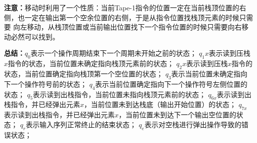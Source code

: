 \begin{solution}
    \textbf{注意：}移动时利用了一个性质：当前Tape-1指令的位置一定在当前栈顶位置的右侧，也一定在输出第一个空余位置的右侧，于是从指令位置找栈顶元素的时候只需要
    向左移动，从栈顶位置或当前输出位置找下一个指令位置的时候只需要向右移动必然可以找到。

    \textbf{总结：}$q_0$表示一个操作周期结束下一个周期未开始之前的状态；
    $q_1x$表示读到压栈$x$指令的状态，当前位置未确定指向栈顶元素前的状态；
    $q_2x$表示读到压栈$x$指令的状态，当前位置确定指向栈顶第一个空位置的状态；
    $q_3$表示当前位置未确定指向下一个操作符号前的状态；
    $q_4$表示当前位置确定指向下一个操作符号左侧位置的状态；
    $q_5$表示读到出栈指令，当前位置未指向栈顶元素前的状态；
    $q_{6x}$表示读到出栈指令，并已经弹出元素$x$，当前位置未到达栈底（输出开始位置）的状态；
    $q_{7x}$表示读到出栈指令，并已经弹出元素$x$，当前位置未到达下一个输出空位置的状态；
    $q_r$表示输入序列正常终止的结束状态；
    $q_e$表示对空栈进行弹出操作导致的错误状态；
\end{solution}